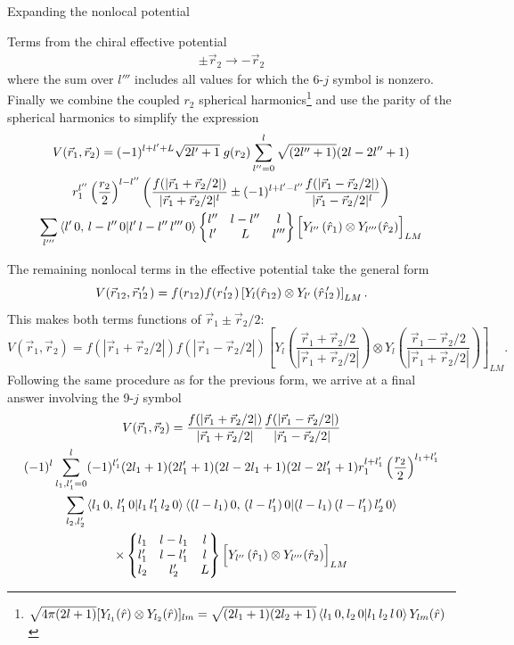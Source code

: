 \begin{section}{Expanding the nonlocal potential}
\begin{subsection}{Terms from the chiral effective potential}
\begin{multline}
\pm \vec{r}_2 \rightarrow -\vec{r}_2
\end{multline}
where the sum over $l'''$ includes all values for which the 6-$j$ symbol is nonzero. Finally we combine the coupled $r_2$ spherical harmonics\footnote{$\sqrt{4\pi(2l+1)}[Y_{l_1}(\hat{r})\otimes Y_{l_2}(\hat{r})]_{lm}=\sqrt{(2l_1+1)(2l_2+1)}\braket{l_1\,0,l_2\,0|l_1\,l_2\,l\,0}Y_{lm}(\hat{r})$} and use the parity of the spherical harmonics to simplify the expression 
\begin{multline}
V(\vec{r}_1,\vec{r}_2)=(-1)^{l+l'+L}\sqrt{2l'+1}\;g(r_2) \sum_{l''=0}^{l} \sqrt{(2l''+1)}(2l-2l''+1)  \\
  r_1^{l''} \left(\frac{r_2}{2}\right)^{l-l''} \left(\frac{f(|\vec{r}_1+\vec{r}_2/2|)}{|\vec{r}_1+\vec{r}_2/2|^{l} } \pm (-1)^{l+l'-l''} \frac{f(|\vec{r}_1-\vec{r}_2/2|)}{|\vec{r}_1-\vec{r}_2/2|^{l} }\right) \\
\sum_{l'''} \braket{l'\,0,\,l-l''\,0 | l'\,l-l''\,l'''\,0} \begin{Bmatrix} l'' & l-l'' & l \\ l' & L & l''' \end{Bmatrix} \Big[Y_{l''}\left(\hat{r}_1\right) \otimes Y_{l'''}(\hat{r}_2) \Big]_{L M} 
\end{multline}

The remaining nonlocal terms in the effective potential take the general form
\begin{equation}
V(\rot,\rotp)=f(r_{12})f(\rotpr) \left[Y_{l}(\hat{r}_{12})\otimes Y_{l'}\left(\rotphat \right)\right]_{L M}.
\end{equation}
This makes both terms functions of $\vec{r}_1\pm\vec{r}_2/2$:
\begin{equation}\label{eq:r1r2Form1}
V(\vec{r}_1,\vec{r}_2)=f(|\vec{r}_1+\vec{r}_2/2|)f(|\vec{r}_1-\vec{r}_2/2|) \left[Y_{l}\left(\frac{\vec{r}_1+\vec{r}_2/2}{|\vec{r}_1+\vec{r}_2/2|}\right)\otimes Y_{l}\left(\frac{\vec{r}_1-\vec{r}_2/2}{|\vec{r}_1+\vec{r}_2/2|}\right) \right]_{L M}.
\end{equation} 
Following the same procedure as for the previous form, we arrive at a final answer involving the 9-$j$ symbol
\begin{multline}
V(\vec{r}_1,\vec{r}_2)=\frac{f(|\vec{r}_1+\vec{r}_2/2|)}{|\vec{r}_1+\vec{r}_2/2|}\frac{f(|\vec{r}_1-\vec{r}_2/2|)}{|\vec{r}_1-\vec{r}_2/2|} \\
(-1)^{l} \sum_{l_1,l'_1=0}^{l} (-1)^{l'_1}(2l_1+1)(2l'_1+1)(2l-2l_1+1)(2l-2l'_1+1) r_1^{l+l'_1} \left(\frac{r_2}{2}\right)^{l_1+l'_1}  \\
\sum_{l_2,l'_2} \braket{l_1\,0,\,l'_1\,0 | l_1\,l'_1\,l_2\,0}\braket{(l-l_1)\,0,\,(l-l'_1)\,0 | (l-l_1)\,(l-l'_1)\,l'_2\,0} \\
\times\begin{Bmatrix} l_1 & l-l_1 & l \\ l'_1 & l-l'_1 & l \\ l_2 & l'_2 & L \end{Bmatrix} \Big[Y_{l''}\left(\hat{r}_1\right) \otimes Y_{l'''}(\hat{r}_2) \Big]_{L M} 
\end{multline}


\end{subsection}

\end{section}

